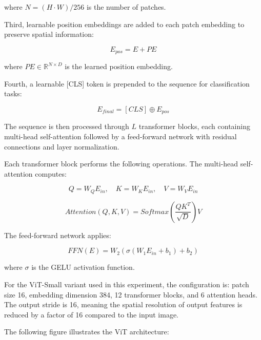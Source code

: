 \documentclass[12pt,a4paper]{article}
\begin{document}
where $N = (H \cdot W) / 256$ is the number of patches.

Third, learnable position embeddings are added to each patch embedding to preserve spatial information:

\begin{equation}
E_{pos} = E + PE
\end{equation}

where $PE \in \mathbb{R}^{N \times D}$ is the learned position embedding.

Fourth, a learnable [CLS] token is prepended to the sequence for classification tasks:

\begin{equation}
E_{final} = [CLS] \oplus E_{pos}
\end{equation}

The sequence is then processed through $L$ transformer blocks, each containing multi-head self-attention followed by a feed-forward network with residual connections and layer normalization.

Each transformer block performs the following operations. The multi-head self-attention computes:

\begin{equation}
Q = W_Q E_{in}, \quad K = W_K E_{in}, \quad V = W_V E_{in}
\end{equation}

\begin{equation}
Attention(Q, K, V) = Softmax\left(\frac{QK^T}{\sqrt{D}}\right)V
\end{equation}

The feed-forward network applies:

\begin{equation}
FFN(E) = W_2(\sigma(W_1 E_{in} + b_1) + b_2)
\end{equation}

where $\sigma$ is the GELU activation function.

For the ViT-Small variant used in this experiment, the configuration is: patch size 16, embedding dimension 384, 12 transformer blocks, and 6 attention heads. The output stride is 16, meaning the spatial resolution of output features is reduced by a factor of 16 compared to the input image.

The following figure illustrates the ViT architecture:
\end{document}
